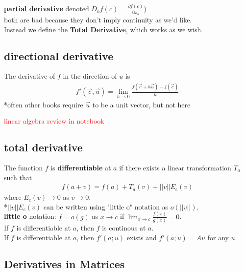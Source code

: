 \documentclass[a4paper, 12pt]{article}
\newcommand{\bt}[1]{\textbf{#1}} %
\newcommand{\eq}[1]{\begin{align*}#1\end{align*}} %
\newcommand{\gray}[1]{\textcolor[gray]{0.5}{#1}} %
\renewcommand{\eq}[1]{\begin{align*}#1\end{align*}} %
\newcommand{\sn}[1]{\reversemarginpar \marginpar{{\small\gray{#1}}}}
\begin{document}
\bt{partial derivative} denoted $D_k f(c) = \frac{\partial f(c)}{\partial x_k}$)\\

both are bad because they don't imply continuity as we'd like.\\
Instead we define the \bt{Total Derivative}, which works as we wish.\\

\subsection*{directional derivative}
The derivative of $f$ in the direction of $u$ is
\eq{
f'(\vec c, \vec u) = \lim_{h \rightarrow 0} \frac{f(\vec c + h \vec u) - f(\vec c)}{h}
}
*often other books require $\vec u$ to be a unit vector, but not here

\textcolor{red}{linear algebra review in notebook}

\subsection*{total derivative}

\sn{correct def}
The function $f$ is \bt{differentiable} at $a$ if there exists a linear transformation $T_a$ such that
\eq{f(a + v) = f(a) + T_a(v) + ||v|| E_c(v)
}
where $E_c(v) \rightarrow 0$ as $v \rightarrow 0$.\\

*$||v||E_c(v)$ can be written using "little o" notation as $o(||v||)$. \\
\bt{little o} notation: $f = o(g)$ as $x \rightarrow c$ if $\lim_{x \rightarrow c} \frac{f(x)}{g(x)} = 0$.\\

\sn{cont}
If $f$ is differentiable at $a$, then $f$ is continous at $a$. \\

\sn{directional deriv}
If $f$ is differentiable at $a$, then $f'(a; u)$ exists and $f'(a; u) = Au$ for any $u$

\subsection*{Derivatives in Matrices}
\end{document}
